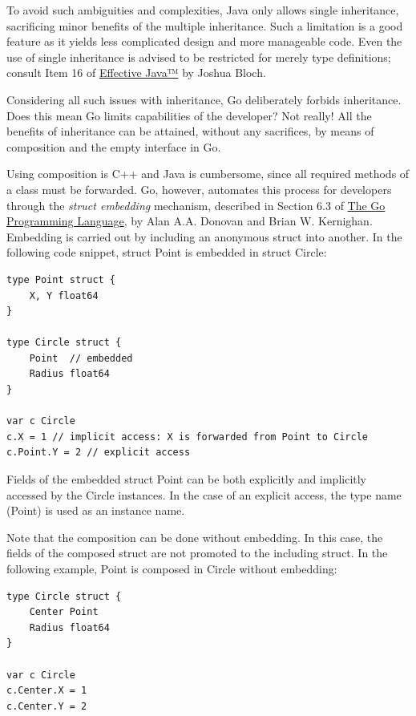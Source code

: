 \documentclass[11pt]{article}
\begin{document}
To avoid such ambiguities and complexities, Java only allows single inheritance, sacrificing minor benefits of the multiple inheritance. Such a limitation is a good feature as it yields less complicated design and more manageable code. Even the use of single inheritance is advised to be restricted for merely type definitions; consult Item 16 of \href{https://www.safaribooksonline.com/library/view/effective-java-2nd/9780137150021/}{Effective Java™} by Joshua Bloch.

Considering all such issues with inheritance, Go deliberately forbids inheritance. Does this mean Go limits capabilities of the developer? Not really! All the benefits of inheritance can be attained, without any sacrifices, by means of composition and the empty interface in Go.

Using composition is C++ and Java is cumbersome, since all required methods of a class must be forwarded. Go, however, automates this process for developers through the \emph{struct embedding} mechanism, described in Section 6.3 of \href{https://dl.acm.org/citation.cfm?id=2851099}{The Go Programming Language}, by Alan A.A. Donovan and Brian W. Kernighan. Embedding is carried out by including an anonymous struct into another. In the following code snippet, struct Point is embedded in struct Circle:
\begin{verbatim}
type Point struct {
	X, Y float64
}

type Circle struct {
	Point  // embedded
	Radius float64
}

var c Circle
c.X = 1 // implicit access: X is forwarded from Point to Circle
c.Point.Y = 2 // explicit access
\end{verbatim}
Fields of the embedded struct Point can be both explicitly and implicitly accessed by the Circle instances. In the case of an explicit access, the type name (Point) is used as an instance name.

Note that the composition can be done without embedding. In this case, the fields of the composed struct are not promoted to the including struct. In the following example, Point is composed in Circle without embedding:
\begin{verbatim}
type Circle struct {
	Center Point
	Radius float64
}

var c Circle
c.Center.X = 1
c.Center.Y = 2
\end{verbatim}
\end{document}
